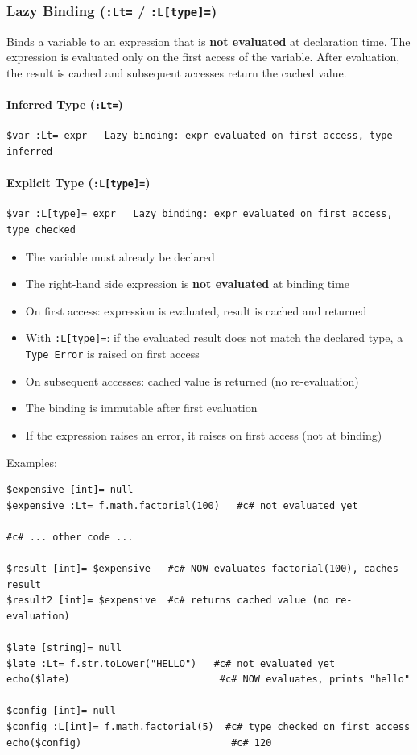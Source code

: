 \subsubsection{Lazy Binding (\texttt{:Lt=} / \texttt{:L[type]=})}
Binds a variable to an expression that is \textbf{not evaluated} at declaration time. The expression is evaluated only on the first access of the variable. After evaluation, the result is cached and subsequent accesses return the cached value.

\paragraph{Inferred Type (\texttt{:Lt=})}
\begin{verbatim}
$var :Lt= expr   Lazy binding: expr evaluated on first access, type inferred
\end{verbatim}

\paragraph{Explicit Type (\texttt{:L[type]=})}
\begin{verbatim}
$var :L[type]= expr   Lazy binding: expr evaluated on first access, type checked
\end{verbatim}
\begin{itemize}
\item The variable must already be declared
\item The right-hand side expression is \textbf{not evaluated} at binding time
\item On first access: expression is evaluated, result is cached and returned
\item With \texttt{:L[type]=}: if the evaluated result does not match the declared type, a \texttt{Type Error} is raised on first access
\item On subsequent accesses: cached value is returned (no re-evaluation)
\item The binding is immutable after first evaluation
\item If the expression raises an error, it raises on first access (not at binding)
\end{itemize}

Examples:
\begin{verbatim}
$expensive [int]= null
$expensive :Lt= f.math.factorial(100)   #c# not evaluated yet

#c# ... other code ...

$result [int]= $expensive   #c# NOW evaluates factorial(100), caches result
$result2 [int]= $expensive  #c# returns cached value (no re-evaluation)

$late [string]= null
$late :Lt= f.str.toLower("HELLO")   #c# not evaluated yet
echo($late)                          #c# NOW evaluates, prints "hello"

$config [int]= null
$config :L[int]= f.math.factorial(5)  #c# type checked on first access
echo($config)                          #c# 120
\end{verbatim}

